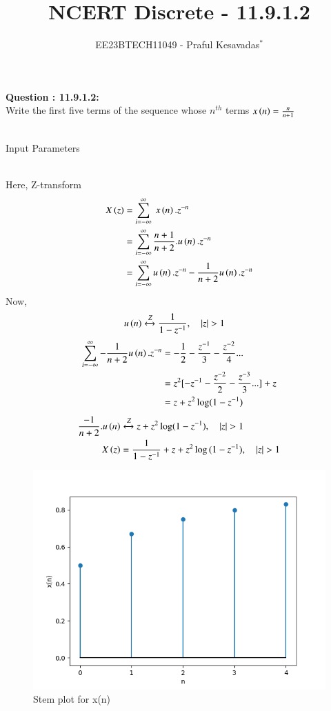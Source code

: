 \documentclass[journal,12pt,onecolumn]{IEEEtran}
\theoremstyle{remark}
\begin{document}

\vspace{3cm}

\title{NCERT Discrete - 11.9.1.2}
\author{EE23BTECH11049 - Praful Kesavadas$^{*}$%
}
\maketitle

\bigskip

\renewcommand{\thefigure}{\theenumi}
\renewcommand{\thetable}{\theenumi}

\textbf{Question : 11.9.1.2:}\\
Write the first five terms of the sequence whose $n^{th}$ terms  $x\left(n\right) = \frac{n}{n+1}$\\
\solution\\
\begin{table}[ht!]
\centering

\caption{Input Parameters}
\end{table}\\
Here, Z-transform
\begin{align}
X\left(z\right) &= \sum_{i=-\infty}^\infty\ x\left(n\right).z^{-n}\\
&= \sum_{i=-\infty}^\infty \frac{n+1}{n+2}.u\left(n\right). z^{-n}\\
&= \sum_{i=-\infty}^\infty u\left(n\right).z^{-n} - \frac{1}{n+2} u\left(n\right).z^{-n}
\end{align}
Now, 
\begin{align}
u\brak{n} &\xleftrightarrow Z  \frac{1}{1-z^{-1}}, \quad{|z|>1}
\end{align}
\begin{align*}
\sum_{i=-\infty}^\infty - \frac{1}{n+2} u\left(n\right).z^{-n} &= -\frac{1}{2}-\frac{z^{-1}}{3}-\frac{z^{-2}}{4}...\\
&= z^2[-z^{-1}-\frac{z^{-2}}{2}-\frac{z^{-3}}{3}...]+z \\
&= z+ z^2\log(1-z^{-1})
\end{align*}
\begin{align}
\frac{-1}{n+2}.u\brak{n} &\xleftrightarrow Z  z+z^2\log(1-z^{-1}), \quad{|z|>1}\\
X\brak{z} &= \frac{1}{1-z^{-1}} + z+ z^2\log{(1-z^{-1})} ,\quad{|z|>1}
\end{align}
\begin{figure}[ht!]
    \centering
    \includegraphics[width=\columnwidth]{figs/graph1.png}
    \caption{Stem plot for x(n)}
    \label{fig:11.9.1.2fig1}
\end{figure}
\end{document}
